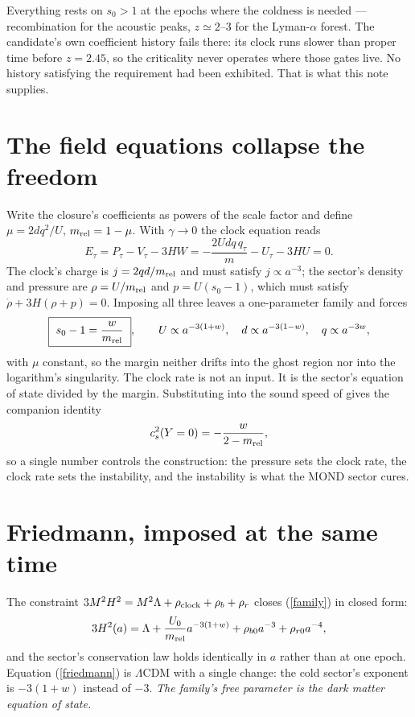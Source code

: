 \documentclass[11pt,letterpaper]{article}
\begin{document}
Everything rests on $s_0>1$ at the epochs where the coldness is needed --- recombination for the acoustic peaks, $z\simeq2$--$3$ for the Lyman-$\alpha$ forest. The candidate's own coefficient history \cite{paper13} fails there: its clock runs slower than proper time before $z=2.45$, so the criticality never operates where those gates live. No history satisfying the requirement had been exhibited. That is what this note supplies.

\section{The field equations collapse the freedom}
Write the closure's coefficients as powers of the scale factor and define $\mu=2dq^2/U$, $m_{\rm rel}=1-\mu$. With $\gamma\to0$ the clock equation reads
\begin{equation}
E_\tau=P_\tau-V_\tau-3HW=-\frac{2Udq\,q_\tau}{m}-U_\tau-3HU=0 .
\end{equation}
The clock's charge is $j=2qd/m_{\rm rel}$ and must satisfy $j\propto a^{-3}$; the sector's density and pressure are $\rho=U/m_{\rm rel}$ and $p=U(s_0-1)$, which must satisfy $\dot\rho+3H(\rho+p)=0$. Imposing all three leaves a one-parameter family and forces
\begin{equation}
\boxed{\ s_0-1=\frac{w}{m_{\rm rel}}\ },\qquad
U\propto a^{-3(1+w)},\quad d\propto a^{-3(1-w)},\quad q\propto a^{-3w},
\label{family}
\end{equation}
with $\mu$ constant, so the margin neither drifts into the ghost region nor into the logarithm's singularity. The clock rate is not an input. It is the sector's equation of state divided by the margin. Substituting into the sound speed of \cite{paper19} gives the companion identity
\begin{equation}
c_s^2(Y=0)=-\frac{w}{2-m_{\rm rel}} ,
\label{cs}
\end{equation}
so a single number controls the construction: the pressure sets the clock rate, the clock rate sets the instability, and the instability is what the MOND sector cures.

\section{Friedmann, imposed at the same time}
The constraint $3M^2H^2=M^2\Lambda+\rho_{\rm clock}+\rho_b+\rho_r$ closes (\ref{family}) in closed form:
\begin{equation}
3H^2(a)=\Lambda+\frac{U_0}{m_{\rm rel}}a^{-3(1+w)}+\rho_{b0}a^{-3}+\rho_{r0}a^{-4},
\label{friedmann}
\end{equation}
and the sector's conservation law holds identically in $a$ rather than at one epoch. Equation (\ref{friedmann}) is $\Lambda$CDM with a single change: the cold sector's exponent is $-3(1+w)$ instead of $-3$. \emph{The family's free parameter is the dark matter equation of state.}
\end{document}
